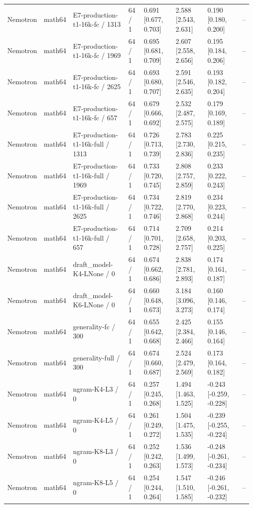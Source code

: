 \begin{tabular}{llllllll}
Nemotron & math64 & E7-production-t1-16k-fc / 1313 & 64 / 1 & 0.691 [0.677, 0.703] & 2.588 [2.543, 2.631] & 0.190 [0.180, 0.200] & -- \\
Nemotron & math64 & E7-production-t1-16k-fc / 1969 & 64 / 1 & 0.695 [0.681, 0.709] & 2.607 [2.558, 2.656] & 0.195 [0.184, 0.206] & -- \\
Nemotron & math64 & E7-production-t1-16k-fc / 2625 & 64 / 1 & 0.693 [0.680, 0.707] & 2.591 [2.546, 2.635] & 0.193 [0.182, 0.204] & -- \\
Nemotron & math64 & E7-production-t1-16k-fc / 657 & 64 / 1 & 0.679 [0.666, 0.692] & 2.532 [2.487, 2.575] & 0.179 [0.169, 0.189] & -- \\
Nemotron & math64 & E7-production-t1-16k-full / 1313 & 64 / 1 & 0.726 [0.713, 0.739] & 2.783 [2.730, 2.836] & 0.225 [0.215, 0.235] & -- \\
Nemotron & math64 & E7-production-t1-16k-full / 1969 & 64 / 1 & 0.733 [0.720, 0.745] & 2.808 [2.757, 2.859] & 0.233 [0.222, 0.243] & -- \\
Nemotron & math64 & E7-production-t1-16k-full / 2625 & 64 / 1 & 0.734 [0.722, 0.746] & 2.819 [2.770, 2.868] & 0.234 [0.223, 0.244] & -- \\
Nemotron & math64 & E7-production-t1-16k-full / 657 & 64 / 1 & 0.714 [0.701, 0.728] & 2.709 [2.658, 2.757] & 0.214 [0.203, 0.225] & -- \\
Nemotron & math64 & draft\_model-K4-LNone / 0 & 64 / 1 & 0.674 [0.662, 0.686] & 2.838 [2.781, 2.893] & 0.174 [0.161, 0.187] & -- \\
Nemotron & math64 & draft\_model-K6-LNone / 0 & 64 / 1 & 0.660 [0.648, 0.673] & 3.184 [3.096, 3.273] & 0.160 [0.146, 0.174] & -- \\
Nemotron & math64 & generality-fc / 300 & 64 / 1 & 0.655 [0.642, 0.668] & 2.425 [2.384, 2.466] & 0.155 [0.146, 0.164] & -- \\
Nemotron & math64 & generality-full / 300 & 64 / 1 & 0.674 [0.660, 0.687] & 2.524 [2.479, 2.569] & 0.173 [0.164, 0.182] & -- \\
Nemotron & math64 & ngram-K4-L3 / 0 & 64 / 1 & 0.257 [0.245, 0.268] & 1.494 [1.463, 1.525] & -0.243 [-0.259, -0.228] & -- \\
Nemotron & math64 & ngram-K4-L5 / 0 & 64 / 1 & 0.261 [0.249, 0.272] & 1.504 [1.475, 1.535] & -0.239 [-0.255, -0.224] & -- \\
Nemotron & math64 & ngram-K8-L3 / 0 & 64 / 1 & 0.252 [0.242, 0.263] & 1.536 [1.499, 1.573] & -0.248 [-0.261, -0.234] & -- \\
Nemotron & math64 & ngram-K8-L5 / 0 & 64 / 1 & 0.254 [0.244, 0.264] & 1.547 [1.510, 1.585] & -0.246 [-0.261, -0.232] & -- \\

\end{tabular}
